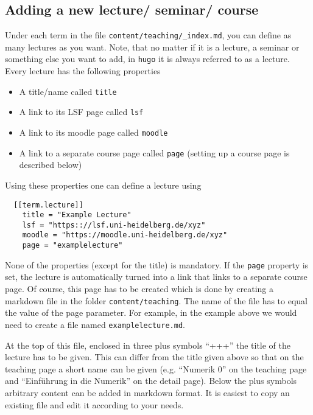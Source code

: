 \documentclass[a4paper,parskip=half]{scrartcl}
\begin{document}
\subsection{Adding a new lecture/ seminar/ course}
Under each term in the file \texttt{content/teaching/\_index.md}, you can define
as many lectures as you want. Note, that no matter if it is a lecture, a seminar
or something else you want to add, in \texttt{hugo} it is always referred to as
a lecture. Every lecture has the following properties
\begin{itemize}
\item A title/name called \texttt{title}
\item A link to its LSF page called \texttt{lsf}
\item A link to its moodle page called \texttt{moodle}
\item A link to a separate course page called \texttt{page} (setting up a course
  page is described below)
\end{itemize}
Using these properties one can define a lecture using
\begin{verbatim}
  [[term.lecture]]
    title = "Example Lecture"
    lsf = "https:://lsf.uni-heidelberg.de/xyz"
    moodle = "https://moodle.uni-heidelberg.de/xyz"
    page = "examplelecture"
\end{verbatim}
None of the properties (except for the title) is mandatory. If the \texttt{page}
property is set, the lecture is automatically turned into a link that links to a
separate course page. Of course, this page has to be created which is done by
creating a markdown file in the folder \texttt{content/teaching}. The name of
the file has to equal the value of the page parameter. For example, in the
example above we would need to create a file named \texttt{examplelecture.md}.

At the top of this file, enclosed in three plus symbols ``+++'' the title of the
lecture has to be given. This can differ from the title given above so that on
the teaching page a short name can be given (e.g. ``Numerik 0'' on the teaching
page and ``Einführung in die Numerik'' on the detail page). Below the plus
symbols arbitrary content can be added in markdown format. It is easiest to copy
an existing file and edit it according to your needs.
\end{document}
